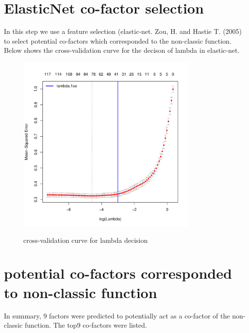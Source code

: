 \documentclass[11pt,a4paper]{article}
\begin{document}
\section{ElasticNet co-factor selection}
In this step we use a feature selection (elastic-net. Zou, H. and Hastie T. (2005) to select potential co-factors which corresponded to the non-classic function. Below shows the cross-validation curve for the decison of lambda in elastic-net.  
\begin{figure}[h]
        \caption{cross-validation curve for lambda decision} \label{fig:profileunion}
        \setlength{\abovecaptionskip}{0pt}
        \setlength{\belowcaptionskip}{10pt}
        \centering
        {\includegraphics[width=0.8\textwidth]{test5_elnet_lambdaSelection.pdf}}
\end{figure}

\newpage
\newpage
\section{potential co-factors corresponded to non-classic function}
In summary, 9 factors were predicted to potentially act as a co-factor of the non-classic function. The top9 co-factors were listed.
\end{document}
